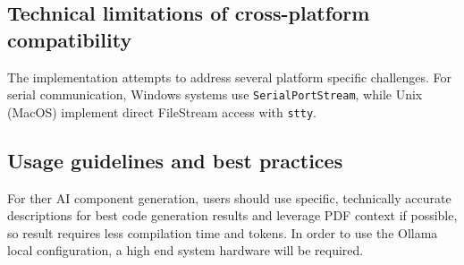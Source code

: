 \subsection{Technical limitations of cross-platform compatibility}

The implementation attempts to address several platform specific challenges. For serial communication, Windows systems use \texttt{SerialPortStream}, while Unix (MacOS) implement direct FileStream access with \texttt{stty}.

\subsection{Usage guidelines and best practices}

For ther AI component generation, users should use specific, technically accurate descriptions for best code generation results and leverage PDF context if possible, so result requires less compilation time and tokens. In order to use the Ollama local configuration, a high end system hardware will be required.